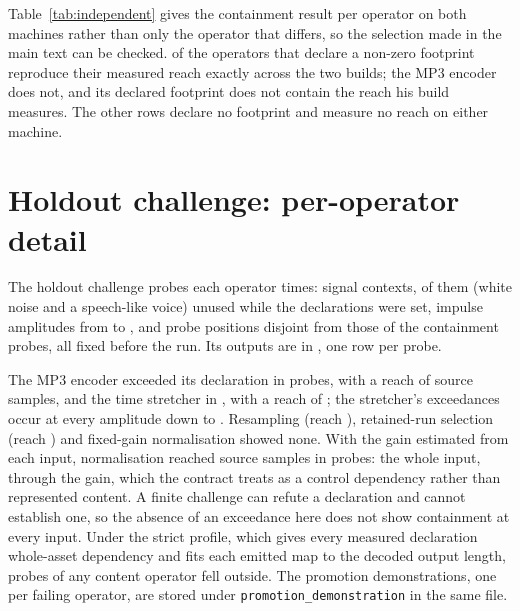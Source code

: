 \documentclass[11pt]{article}
\begin{document}
Table~\ref{tab:independent} gives the containment result per operator on both
machines rather than only the operator that differs, so the selection made in
the main text can be checked. \IRopsAgree{} of the \IRopsNonzero{} operators
that declare a non-zero footprint reproduce their measured reach exactly across
the two builds; the MP3 encoder does not, and its declared footprint does not
contain the reach his build measures. The other \IRopsZero{} rows declare no
footprint and measure no reach on either machine.

\begin{table}[htbp]
\centering
\caption{Kernel-support containment on the reference machine and on the
independent reproducer's machine. \emph{Declared} is the footprint of
Table~\TabOperators{} of the manuscript, in source samples; \emph{Reach} is the widest
measured influence of a single input sample; \emph{Outside} counts output
samples whose dependency falls outside the declared support. The dagger marks
the one operator whose reach did not reproduce.}
\label{tab:independent}
\small\setlength{\tabcolsep}{4.5pt}

\end{table}

\section{Holdout challenge: per-operator detail}
\label{sec:supp-holdout}

The holdout challenge probes each operator \KtwoProbesPerOp{} times: \KtwoContexts{}
signal contexts, \KtwoHoldoutContexts{} of them (white noise and a speech-like
voice) unused while the declarations were set, \KtwoAmps{} impulse amplitudes
from \KtwoAmpMin{} to \KtwoAmpMax{}, and \KtwoPositions{} probe positions
disjoint from those of the containment probes, all fixed before the run. Its outputs are in
, one row per probe.

The MP3 encoder exceeded its declaration in \KtwoMpExceed{} probes, with a reach
of \KtwoMpReach{} source samples, and the time stretcher in \KtwoStExceed{},
with a reach of \KtwoStReach{}; the stretcher's exceedances occur at every
amplitude down to \KtwoStMinAmp{}. Resampling (reach \KtwoResampleReach{}),
retained-run selection (reach \KtwoSelReach{}) and fixed-gain normalisation
showed none. With the gain estimated from each input, normalisation reached
\KtwoNormCtrlReach{} source samples in \KtwoNormCtrlExceed{} probes: the whole
input, through the gain, which the contract treats as a control dependency
rather than represented content. A finite challenge can refute a declaration
and cannot establish one, so the absence of an exceedance here does not show
containment at every input.
Under the strict profile, which gives every measured declaration whole-asset
dependency and fits each emitted map to the decoded output length,
\KtwoStrictProbes{} probes of any content operator fell outside. The promotion
demonstrations, one per failing operator, are stored under
\texttt{promotion\_demonstration} in the same file.
\end{document}
